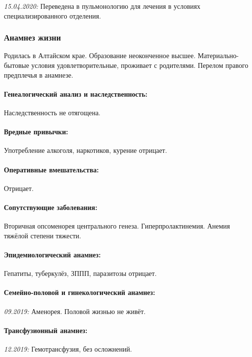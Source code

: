 \documentclass[a4paper,14pt]{extarticle}
\newcommand{\pdate}[1]{\emph{#1:} }
\begin{document}
\pdate{15.04.2020} Переведена в пульмонологию для лечения в условиях специализированного отделения.

\subsubsection*{Анамнез жизни}

Родилась в Алтайском крае.
Образование неоконченное высшее.
Материально\hyp{}бытовые условия удовлетворительные, проживает с родителями.
Перелом правого предплечья в анамнезе.

\paragraph{Генеалогический анализ и наследственность:} Наследственность не отягощена.

\paragraph{Вредные привычки:} Употребление алкоголя, наркотиков, курение отрицает.

\paragraph{Оперативные вмешательства:} Отрицает.

\paragraph{Сопутствующие заболевания:} Вторичная опсоменорея центрального генеза. Гиперпролактинемия. Анемия тяжёлой степени тяжести.

\paragraph{Эпидемиологический анамнез:} Гепатиты, туберкулёз, ЗППП, паразитозы отрицает.

\paragraph{Семейно-половой и гинекологический анамнез:} \pdate{09.2019} Аменорея. Половой жизнью не живёт.

\paragraph{Трансфузионный анамнез:} \pdate{12.2019} Гемотрансфузия, без осложнений.
\end{document}
